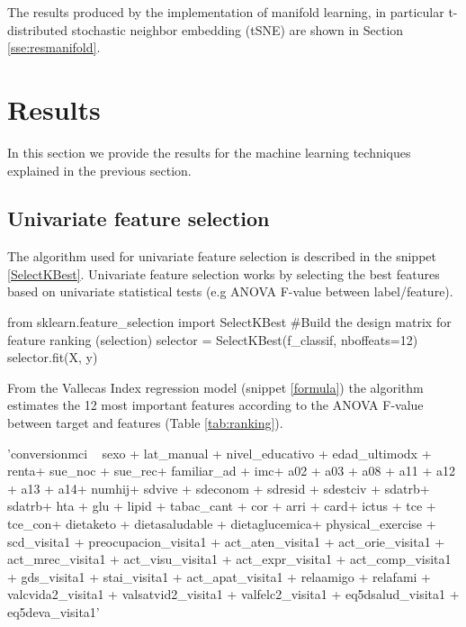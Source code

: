 \documentclass[11pt]{article}
\theoremstyle{definition}
\theoremstyle{remark}
\begin{document}
The results produced by the implementation of manifold learning, in particular t-distributed stochastic neighbor embedding (tSNE) are shown in Section \ref{sse:resmanifold}.


\newpage

\section{Results}
\label{se:res}

In this section we provide the results for the machine learning techniques explained in the previous section.

\subsection{Univariate feature selection}
\label{se:reslinreg}

The algorithm used for univariate feature selection is described in the snippet \ref{SelectKBest}. Univariate feature selection works by selecting the best features based on univariate statistical tests (e.g ANOVA F-value between label/feature).

\begin{code}[caption=SelectKBest, label=SelectKBest]
from sklearn.feature_selection import SelectKBest
#Build the design matrix for feature ranking (selection)
selector = SelectKBest(f_classif, nboffeats=12)
selector.fit(X, y)
\end{code}

From the Vallecas Index regression model (snippet \ref{formula}) the algorithm estimates the 12 most important features according to the ANOVA F-value between target and features (Table \ref{tab:ranking}).

\begin{code}[caption=Regression formula, label=formula]
'conversionmci ~ sexo + lat_manual + nivel_educativo  + edad_ultimodx + renta+ sue_noc + sue_rec+ familiar_ad + imc+ a02 + a03 + a08 + a11 + a12 + a13 + a14+ numhij+ sdvive + sdeconom + sdresid + sdestciv + sdatrb+ sdatrb+ hta + glu + lipid + tabac_cant + cor + arri + card+ ictus + tce + tce_con+ dietaketo + dietasaludable + dietaglucemica+ physical_exercise + scd_visita1 + preocupacion_visita1 + act_aten_visita1 + act_orie_visita1 + act_mrec_visita1 + act_visu_visita1 + act_expr_visita1 + act_comp_visita1 + gds_visita1 + stai_visita1 + act_apat_visita1 + relaamigo + relafami + valcvida2_visita1 + valsatvid2_visita1 + valfelc2_visita1 + eq5dsalud_visita1 + eq5deva_visita1'
\end{code}
\end{document}
